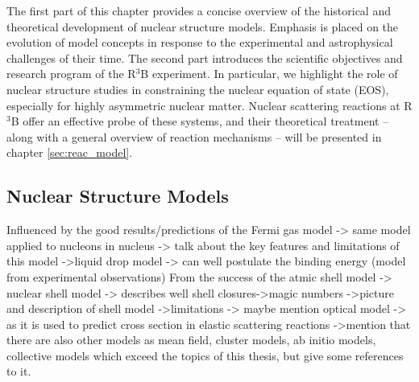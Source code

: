 The first part of this chapter provides a concise overview of the historical and theoretical development of nuclear structure models. Emphasis is placed on the evolution of model concepts in response to the experimental and astrophysical challenges of their time. The second part introduces the scientific objectives and research program of the R$^3$B experiment. In particular, we highlight the role of nuclear structure studies in constraining the nuclear equation of state (EOS), especially for highly asymmetric nuclear matter. Nuclear scattering reactions at R$^3$B offer an effective probe of these systems, and their theoretical treatment -- along with a general overview of reaction mechanisms -- will be presented in chapter \ref{sec:reac_model}.

\subsection{Nuclear Structure Models}
Influenced by the good results/predictions of the Fermi gas model -> same model applied to nucleons in nucleus
-> talk about the key features and limitations of this model
->liquid drop model -> can well postulate the binding energy (model from experimental observations)
From the success of the atmic shell model -> nuclear shell model
-> describes well shell closures->magic numbers
->picture and description of shell model
->limitations
-> maybe mention optical model -> as it is used to predict cross section in elastic scattering reactions
->mention that  there are also other models as mean field, cluster models, ab initio models, collective models which exceed the topics of this thesis, but give some references to it.
